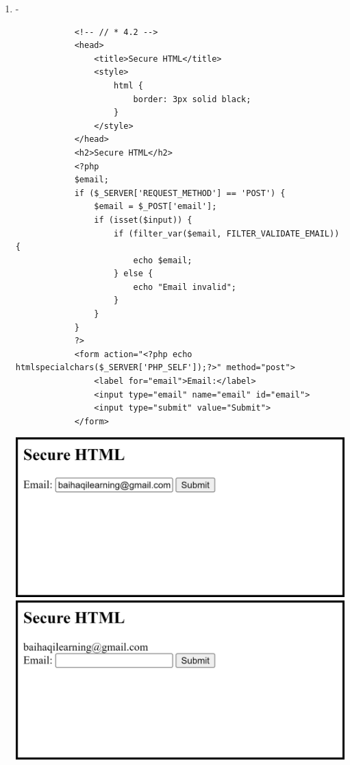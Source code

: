 \documentclass[12pt,titlepage]{article}
\begin{document}
\begin{enumerate}
\begin{enumerate}
        \newpage

        \item -
        \begin{verbatim}
            <!-- // * 4.2 -->
            <head>
                <title>Secure HTML</title>
                <style>
                    html {
                        border: 3px solid black;
                    }
                </style>
            </head>
            <h2>Secure HTML</h2>
            <?php
            $email;
            if ($_SERVER['REQUEST_METHOD'] == 'POST') {
                $email = $_POST['email'];
                if (isset($input)) {
                    if (filter_var($email, FILTER_VALIDATE_EMAIL)) {
                        echo $email;
                    } else {
                        echo "Email invalid";
                    }
                }
            }
            ?>
            <form action="<?php echo htmlspecialchars($_SERVER['PHP_SELF']);?>" method="post">
                <label for="email">Email:</label>
                <input type="email" name="email" id="email">
                <input type="submit" value="Submit">
            </form>
        \end{verbatim}

        \newpage

        \includegraphics[width=.85\textwidth]{images/figures/fig4.2_a.png} \\
        \includegraphics[width=.85\textwidth]{images/figures/fig4.2_b.png} \\
        

\end{enumerate}
\end{enumerate}
\end{document}
